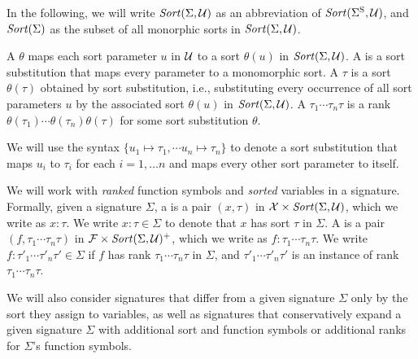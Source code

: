 \begin{newver}
\begin{notation}
In the following, we will write $\mathit{Sort}(\Sigma, \mathcal{U})$ as an abbreviation 
of $\mathit{Sort}(\Sigma^\mathrm{S}, \mathcal{U})$, and $\mathit{Sort}(\Sigma)$ as the subset of all 
monorphic sorts in $\mathit{Sort}(\Sigma, \mathcal{U})$.
\end{notation}

\begin{definition}
A  $\theta$
maps each sort parameter $u$ in $\mathcal{U}$ to a sort $\theta(u)$ in $\mathit{Sort}(\Sigma,\mathcal{U})$.
A  is a sort substitution that maps every parameter
to a monomorphic sort.
A  $\tau$ is a sort $\theta(\tau)$ obtained
by sort substitution, i.e.,
substituting every occurrence of all sort parameters $u$ by the associated sort
$\theta(u)$ in $\mathit{Sort}(\Sigma,\mathcal{U})$.
A  $\tau_1\cdots\tau_n \tau$ is a rank
$\theta(\tau_1)\cdots\theta(\tau_n)\theta(\tau)$ for some sort substitution
$\theta$.
\end{definition}
We will use the syntax $\{u_1 \mapsto \tau_1, \cdots u_n \mapsto \tau_n \}$
to denote a sort substitution that maps $u_i$ to $\tau_i$ for each $i=1,\dots n$
and maps every other sort parameter to itself.
\end{newver}

We will work with \emph{ranked} function symbols and \emph{sorted} variables
in a signature.
Formally,
given a signature $\Sigma$,
a  is 
a pair $(x,\tau)$ in $\mathcal{X} \times \mathit{Sort}(\Sigma, \mathcal{U})$,
which we write as $x{:}\tau$.
We write $x{:}\tau \in \Sigma$
to denote that $x$ has sort $\tau$ in $\Sigma$.
A  is 
a pair $(f, \tau_1\cdots\tau_n\tau)$ in $\mathcal{F} \times \mathit{Sort}(\Sigma, \mathcal{U})^+$,
which we write as $f{:}\tau_1\cdots\tau_n\tau$.
We write  $f{:}\tau'_1\cdots\tau'_n\tau' \in \Sigma$
if $f$ has rank $\tau_1\cdots\tau_n\tau$ in $\Sigma$, and
$\tau'_1\cdots\tau'_n\tau'$ is an instance of rank $\tau_1\cdots\tau_n\tau$.

We will also consider signatures that differ from a given signature $\Sigma$
only by the sort they assign to variables,
as well as signatures that conservatively expand a given signature $\Sigma$
with additional sort and function symbols or additional ranks 
for $\Sigma$'s function symbols.

